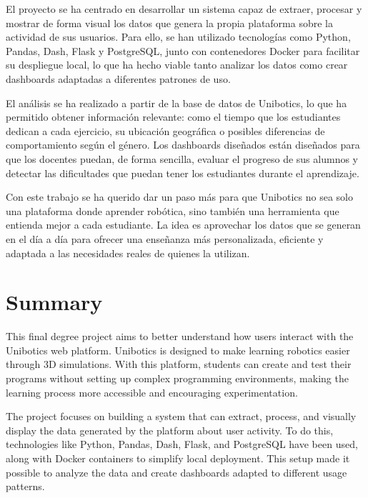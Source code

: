 \documentclass[a4paper, 12pt]{book}
\begin{document}
El proyecto se ha centrado en desarrollar un sistema capaz de extraer, procesar y mostrar de forma visual los datos que genera la propia plataforma sobre la actividad de sus usuarios. Para ello, se han utilizado tecnologías como Python, Pandas, Dash, Flask y PostgreSQL, junto con contenedores Docker para facilitar su despliegue local, lo que ha hecho viable tanto analizar los datos como crear dashboards adaptadas a diferentes patrones de uso.

El análisis se ha realizado a partir de la base de datos de Unibotics, lo que ha permitido obtener información relevante: como el tiempo que los estudiantes dedican a cada ejercicio, su ubicación geográfica o posibles diferencias de comportamiento según el género. Los dashboards diseñados están diseñados para que los docentes puedan, de forma sencilla, evaluar el progreso de sus alumnos y detectar las dificultades que puedan tener los estudiantes durante el aprendizaje.

Con este trabajo se ha querido dar un paso más para que Unibotics no sea solo una plataforma donde aprender robótica, sino también una herramienta que entienda mejor a cada estudiante. La idea es aprovechar los datos que se generan en el día a día para ofrecer una enseñanza más personalizada, eficiente y adaptada a las necesidades reales de quienes la utilizan.


\chapter*{Summary}

This final degree project aims to better understand how users interact with the Unibotics web platform. Unibotics is designed to make learning robotics easier through 3D simulations. With this platform, students can create and test their programs without setting up complex programming environments, making the learning process more accessible and encouraging experimentation.

The project focuses on building a system that can extract, process, and visually display the data generated by the platform about user activity. To do this, technologies like Python, Pandas, Dash, Flask, and PostgreSQL have been used, along with Docker containers to simplify local deployment. This setup made it possible to analyze the data and create dashboards adapted to different usage patterns.
\end{document}

